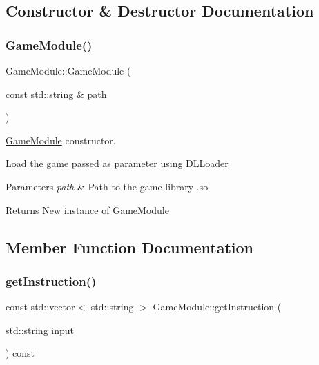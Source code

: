 \subsection{Constructor \& Destructor Documentation}
\mbox{\label{class_game_module_a9d2cc872e80e4107d7f87818e9ea5455}} 
\subsubsection{\texorpdfstring{Game\+Module()}{GameModule()}}
{\footnotesize\ttfamily Game\+Module\+::\+Game\+Module (\begin{DoxyParamCaption}\item[{const std\+::string \&}]{path }\end{DoxyParamCaption})}



\hyperlink{class_game_module}{Game\+Module} constructor. 

Load the game passed as parameter using \hyperlink{class_d_l_loader}{D\+L\+Loader}


\begin{DoxyParams}{Parameters}
{\em path} & Path to the game library .so\\
\hline
\end{DoxyParams}
\begin{DoxyReturn}{Returns}
New instance of \hyperlink{class_game_module}{Game\+Module} 
\end{DoxyReturn}


\subsection{Member Function Documentation}
\mbox{\label{class_game_module_ab82644e3a4e4a5aa41c4f8e9c6077af7}} 
\subsubsection{\texorpdfstring{get\+Instruction()}{getInstruction()}}
{\footnotesize\ttfamily const std\+::vector$<$ std\+::string $>$ Game\+Module\+::get\+Instruction (\begin{DoxyParamCaption}\item[{std\+::string}]{input }\end{DoxyParamCaption}) const}



